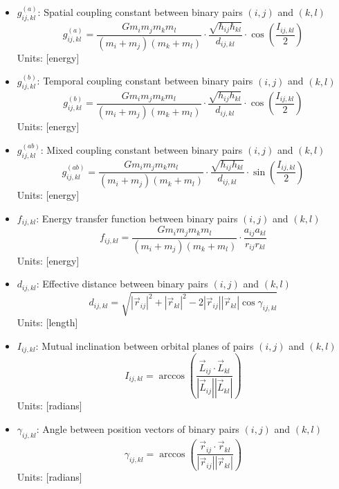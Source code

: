 \documentclass{article}
\begin{document}
\begin{itemize}
\item $g_{ij,kl}^{(a)}$: Spatial coupling constant between binary pairs $(i,j)$ and $(k,l)$
    \begin{equation}
    g_{ij,kl}^{(a)} = \frac{G m_i m_j m_k m_l}{(m_i+m_j)(m_k+m_l)} \cdot \frac{\sqrt{\hbar_{ij}\hbar_{kl}}}{d_{ij,kl}} \cdot \cos\left(\frac{I_{ij,kl}}{2}\right)
    \end{equation}
    Units: [energy]
    
\item $g_{ij,kl}^{(b)}$: Temporal coupling constant between binary pairs $(i,j)$ and $(k,l)$
    \begin{equation}
    g_{ij,kl}^{(b)} = \frac{G m_i m_j m_k m_l}{(m_i+m_j)(m_k+m_l)} \cdot \frac{\sqrt{h_{ij}h_{kl}}}{d_{ij,kl}} \cdot \cos\left(\frac{I_{ij,kl}}{2}\right)
    \end{equation}
    Units: [energy]
    
\item $g_{ij,kl}^{(ab)}$: Mixed coupling constant between binary pairs $(i,j)$ and $(k,l)$
    \begin{equation}
    g_{ij,kl}^{(ab)} = \frac{G m_i m_j m_k m_l}{(m_i+m_j)(m_k+m_l)} \cdot \frac{\sqrt{\hbar_{ij}h_{kl}}}{d_{ij,kl}} \cdot \sin\left(\frac{I_{ij,kl}}{2}\right)
    \end{equation}
    Units: [energy]
    
\item $f_{ij,kl}$: Energy transfer function between binary pairs $(i,j)$ and $(k,l)$
    \begin{equation}
    f_{ij,kl} = \frac{G m_i m_j m_k m_l}{(m_i+m_j)(m_k+m_l)} \cdot \frac{a_{ij}a_{kl}}{r_{ij}r_{kl}}
    \end{equation}
    Units: [energy]
    
\item $d_{ij,kl}$: Effective distance between binary pairs $(i,j)$ and $(k,l)$
    \begin{equation}
    d_{ij,kl} = \sqrt{|\vec{r}_{ij}|^2 + |\vec{r}_{kl}|^2 - 2|\vec{r}_{ij}||\vec{r}_{kl}|\cos\gamma_{ij,kl}}
    \end{equation}
    Units: [length]
    
\item $I_{ij,kl}$: Mutual inclination between orbital planes of pairs $(i,j)$ and $(k,l)$
    \begin{equation}
    I_{ij,kl} = \arccos\left(\frac{\vec{L}_{ij} \cdot \vec{L}_{kl}}{|\vec{L}_{ij}||\vec{L}_{kl}|}\right)
    \end{equation}
    Units: [radians]
    
\item $\gamma_{ij,kl}$: Angle between position vectors of binary pairs $(i,j)$ and $(k,l)$
    \begin{equation}
    \gamma_{ij,kl} = \arccos\left(\frac{\vec{r}_{ij} \cdot \vec{r}_{kl}}{|\vec{r}_{ij}||\vec{r}_{kl}|}\right)
    \end{equation}
    Units: [radians]
\end{itemize}
\end{document}
